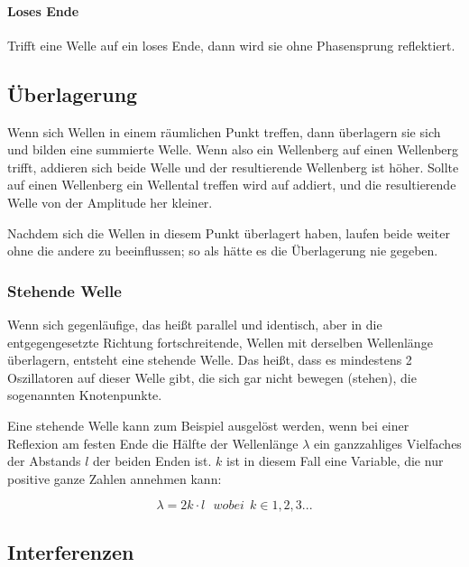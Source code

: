 	\paragraph{Loses Ende}
	
	Trifft eine Welle auf ein loses Ende, dann wird sie ohne  Phasensprung reflektiert.



\subsection{Überlagerung}

Wenn sich Wellen in einem räumlichen Punkt treffen, dann überlagern sie sich und bilden eine summierte Welle. Wenn also ein Wellenberg auf einen Wellenberg trifft, addieren sich beide Welle und der resultierende Wellenberg ist höher. Sollte auf einen Wellenberg ein Wellental treffen wird auf addiert, und die resultierende Welle von der Amplitude her kleiner.

Nachdem sich die Wellen in diesem Punkt überlagert haben, laufen beide weiter ohne die andere zu beeinflussen; so als hätte es die Überlagerung nie gegeben.

	\subsubsection{Stehende Welle}
	
	Wenn sich gegenläufige, das heißt parallel und identisch, aber in die entgegengesetzte Richtung fortschreitende, Wellen mit derselben Wellenlänge überlagern, entsteht eine stehende Welle. 
	Das heißt, dass es mindestens 2 Oszillatoren auf dieser Welle gibt, die sich gar nicht bewegen (\glqq stehen\grqq), die sogenannten Knotenpunkte.
	
	Eine stehende Welle kann zum Beispiel ausgelöst werden, wenn bei einer Reflexion am festen Ende die Hälfte der Wellenlänge $\lambda$ ein ganzzahliges Vielfaches der Abstands $l$ der beiden Enden ist. $k$ ist in diesem Fall eine Variable, die nur positive ganze Zahlen annehmen kann:
	
	\begin{equation} \label{stehendewelle}
		\lambda = 2k \cdot l \ \ \ wobei \ \ k \in 1,2,3...
	\end{equation}



\subsection{Interferenzen} \label{sec:interferenz}

